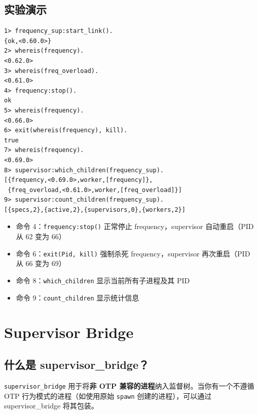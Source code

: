 \documentclass[a4paper,11pt]{article}
\begin{document}
\subsection{实验演示}

\begin{lstlisting}[style=shellstyle, caption={动态子进程管理实验}]
1> frequency_sup:start_link().
{ok,<0.60.0>}
2> whereis(frequency).
<0.62.0>
3> whereis(freq_overload).
<0.61.0>
4> frequency:stop().
ok
5> whereis(frequency).
<0.66.0>
6> exit(whereis(frequency), kill).
true
7> whereis(frequency).
<0.69.0>
8> supervisor:which_children(frequency_sup).
[{frequency,<0.69.0>,worker,[frequency]},
 {freq_overload,<0.61.0>,worker,[freq_overload]}]
9> supervisor:count_children(frequency_sup).
[{specs,2},{active,2},{supervisors,0},{workers,2}]
\end{lstlisting}

\begin{notebox}[观察]
\begin{itemize}[leftmargin=1.5em]
    \item 命令 4：\texttt{frequency:stop()} 正常停止 frequency，supervisor 自动重启（PID 从 62 变为 66）
    \item 命令 6：\texttt{exit(Pid, kill)} 强制杀死 frequency，supervisor 再次重启（PID 从 66 变为 69）
    \item 命令 8：\texttt{which\_children} 显示当前所有子进程及其 PID
    \item 命令 9：\texttt{count\_children} 显示统计信息
\end{itemize}
\end{notebox}


\section{Supervisor Bridge}

\subsection{什么是 supervisor\_bridge？}

\texttt{supervisor\_bridge} 用于将\textbf{非 OTP 兼容的进程}纳入监督树。当你有一个不遵循 OTP 行为模式的进程（如使用原始 \texttt{spawn} 创建的进程），可以通过 supervisor\_bridge 将其包装。
\end{document}
